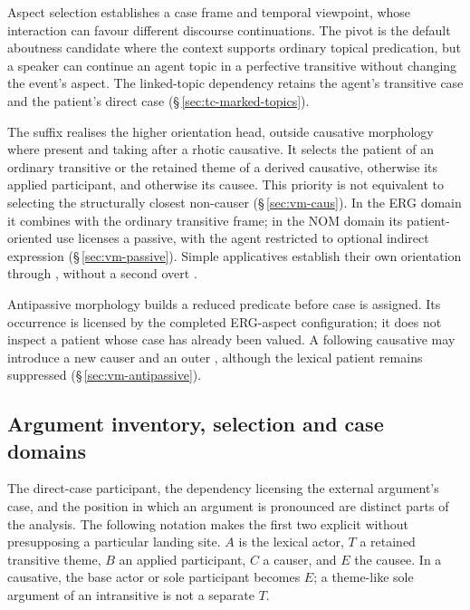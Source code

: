 Aspect selection establishes a case frame and temporal viewpoint, whose
 interaction can favour different discourse continuations. The pivot is the
 default aboutness candidate where the context supports ordinary topical
 predication, but a speaker can continue an agent topic in a perfective
 transitive without changing the event's aspect. The linked-topic dependency
 retains the agent's transitive case and the patient's direct case
 (§\,\ref{sec:tc-marked-topics}).

The suffix  realises the higher orientation head, outside causative
morphology where present and taking  after a rhotic causative.
It selects the patient of an ordinary transitive or
the retained theme of a derived causative, otherwise its applied participant,
and otherwise its causee. This priority is not equivalent to selecting the
structurally closest non-causer (§\,\ref{sec:vm-caus}). In the ERG domain it
combines with the ordinary transitive frame; in the NOM domain its
patient-oriented use licenses a passive, with the agent restricted to optional
indirect expression (§\,\ref{sec:vm-passive}). Simple applicatives establish
their own orientation through , without a second overt .

Antipassive morphology builds a reduced predicate before case is assigned.
Its occurrence is licensed by the completed ERG-aspect configuration; it does
not inspect a patient whose case has already been valued. A following
causative may introduce a new causer and an outer , although the
lexical patient remains suppressed (§\,\ref{sec:vm-antipassive}).

\subsection{Argument inventory, selection and case domains}
\label{sec:vm-selection-domains}

The direct-case participant, the dependency licensing the external argument's
case, and the position in which an argument is pronounced are distinct parts
of the analysis. The following notation makes the first two explicit without
presupposing a particular landing site. $A$ is the lexical actor, $T$ a
retained transitive theme, $B$ an applied participant, $C$ a causer, and $E$
the causee. In a causative, the base actor or sole participant becomes $E$;
a theme-like sole argument of an intransitive is not a separate $T$.

